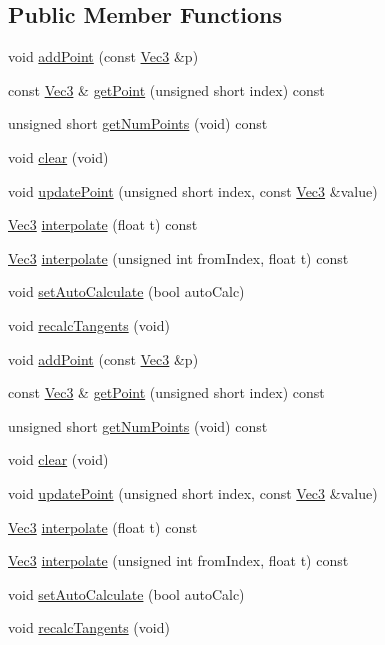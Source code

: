 \subsection*{Public Member Functions}
\begin{DoxyCompactItemize}
\item 
void \hyperlink{classPUSimpleSpline_a0ddc226361cdefb81452c2ff42bd5f8f}{add\+Point} (const \hyperlink{classVec3}{Vec3} \&p)
\item 
const \hyperlink{classVec3}{Vec3} \& \hyperlink{classPUSimpleSpline_a3b217c8b9c53dbac86d03dbc6be92c67}{get\+Point} (unsigned short index) const
\item 
unsigned short \hyperlink{classPUSimpleSpline_aff27dad383a423321ff1d35b37f3770e}{get\+Num\+Points} (void) const
\item 
void \hyperlink{classPUSimpleSpline_a43bf47f7d4ae7687aec7eb7e202630d1}{clear} (void)
\item 
void \hyperlink{classPUSimpleSpline_afb05b4a7e2bc40bd6dacc18c1d978fe2}{update\+Point} (unsigned short index, const \hyperlink{classVec3}{Vec3} \&value)
\item 
\hyperlink{classVec3}{Vec3} \hyperlink{classPUSimpleSpline_afb14b877762e923b8dd181bb0ea2ab17}{interpolate} (float t) const
\item 
\hyperlink{classVec3}{Vec3} \hyperlink{classPUSimpleSpline_af723449337dfbead79ce52ba36f787e3}{interpolate} (unsigned int from\+Index, float t) const
\item 
void \hyperlink{classPUSimpleSpline_aaac246974445d71eba4bd4ade9ee6d33}{set\+Auto\+Calculate} (bool auto\+Calc)
\item 
void \hyperlink{classPUSimpleSpline_a9f888891b07d83f57b68da9b926157c6}{recalc\+Tangents} (void)
\item 
void \hyperlink{classPUSimpleSpline_a0ddc226361cdefb81452c2ff42bd5f8f}{add\+Point} (const \hyperlink{classVec3}{Vec3} \&p)
\item 
const \hyperlink{classVec3}{Vec3} \& \hyperlink{classPUSimpleSpline_a64159a11fe5370b9fa3c1f2ee428f294}{get\+Point} (unsigned short index) const
\item 
unsigned short \hyperlink{classPUSimpleSpline_aff27dad383a423321ff1d35b37f3770e}{get\+Num\+Points} (void) const
\item 
void \hyperlink{classPUSimpleSpline_a43bf47f7d4ae7687aec7eb7e202630d1}{clear} (void)
\item 
void \hyperlink{classPUSimpleSpline_afb05b4a7e2bc40bd6dacc18c1d978fe2}{update\+Point} (unsigned short index, const \hyperlink{classVec3}{Vec3} \&value)
\item 
\hyperlink{classVec3}{Vec3} \hyperlink{classPUSimpleSpline_afb14b877762e923b8dd181bb0ea2ab17}{interpolate} (float t) const
\item 
\hyperlink{classVec3}{Vec3} \hyperlink{classPUSimpleSpline_af723449337dfbead79ce52ba36f787e3}{interpolate} (unsigned int from\+Index, float t) const
\item 
void \hyperlink{classPUSimpleSpline_aaac246974445d71eba4bd4ade9ee6d33}{set\+Auto\+Calculate} (bool auto\+Calc)
\item 
void \hyperlink{classPUSimpleSpline_a9f888891b07d83f57b68da9b926157c6}{recalc\+Tangents} (void)
\end{DoxyCompactItemize}
